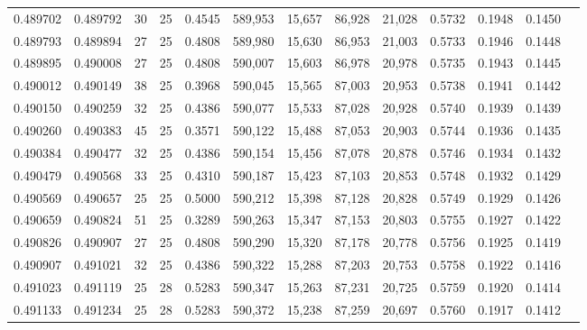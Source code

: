 \begin{tabular}{rrrrrrrrrrrrr}
0.489702 & 0.489792 &    30 &  25 &                                     0.4545 & 589,953 &  15,657 &  86,928 &  21,028 & 0.5732 & 0.1948 & 0.1450 \\
0.489793 & 0.489894 &    27 &  25 &                                     0.4808 & 589,980 &  15,630 &  86,953 &  21,003 & 0.5733 & 0.1946 & 0.1448 \\
0.489895 & 0.490008 &    27 &  25 &                                     0.4808 & 590,007 &  15,603 &  86,978 &  20,978 & 0.5735 & 0.1943 & 0.1445 \\
0.490012 & 0.490149 &    38 &  25 &                                     0.3968 & 590,045 &  15,565 &  87,003 &  20,953 & 0.5738 & 0.1941 & 0.1442 \\
0.490150 & 0.490259 &    32 &  25 &                                     0.4386 & 590,077 &  15,533 &  87,028 &  20,928 & 0.5740 & 0.1939 & 0.1439 \\
0.490260 & 0.490383 &    45 &  25 &                                     0.3571 & 590,122 &  15,488 &  87,053 &  20,903 & 0.5744 & 0.1936 & 0.1435 \\
0.490384 & 0.490477 &    32 &  25 &                                     0.4386 & 590,154 &  15,456 &  87,078 &  20,878 & 0.5746 & 0.1934 & 0.1432 \\
0.490479 & 0.490568 &    33 &  25 &                                     0.4310 & 590,187 &  15,423 &  87,103 &  20,853 & 0.5748 & 0.1932 & 0.1429 \\
0.490569 & 0.490657 &    25 &  25 &                                     0.5000 & 590,212 &  15,398 &  87,128 &  20,828 & 0.5749 & 0.1929 & 0.1426 \\
0.490659 & 0.490824 &    51 &  25 &                                     0.3289 & 590,263 &  15,347 &  87,153 &  20,803 & 0.5755 & 0.1927 & 0.1422 \\
0.490826 & 0.490907 &    27 &  25 &                                     0.4808 & 590,290 &  15,320 &  87,178 &  20,778 & 0.5756 & 0.1925 & 0.1419 \\
0.490907 & 0.491021 &    32 &  25 &                                     0.4386 & 590,322 &  15,288 &  87,203 &  20,753 & 0.5758 & 0.1922 & 0.1416 \\
0.491023 & 0.491119 &    25 &  28 &                                     0.5283 & 590,347 &  15,263 &  87,231 &  20,725 & 0.5759 & 0.1920 & 0.1414 \\
0.491133 & 0.491234 &    25 &  28 &                                     0.5283 & 590,372 &  15,238 &  87,259 &  20,697 & 0.5760 & 0.1917 & 0.1412 \\

\end{tabular}
